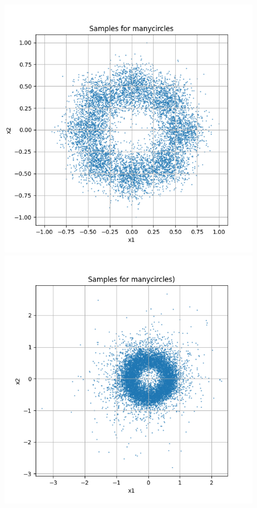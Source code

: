 \documentclass[a4paper,12pt]{article}
\begin{document}
\begin{figure}[h]
  \centering
  \begin{minipage}{0.3\textwidth}
      \centering
      \includegraphics[width=\linewidth]{images/manycircles.png}
  \end{minipage}
  \begin{minipage}{0.3\textwidth}
      \centering
      \includegraphics[width=\linewidth]{"images/Samples for ddpm_2_10_0.0001_0.02_manycircles.png"}

\end{minipage}
\end{figure}
\end{document}
